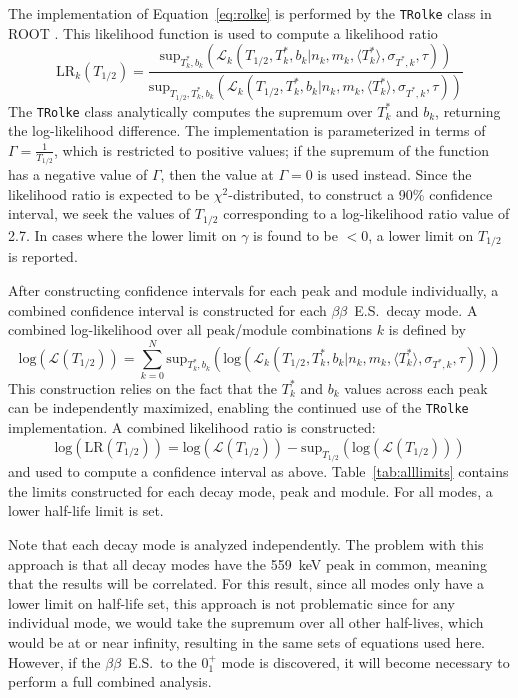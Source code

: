 \documentclass[notitlepage,rmp,aps,10pt]{revtex4-1}
\newcommand{\bb}{${\beta \beta}$}
\newcommand{\bbes}{\bb~E.S.}
\newcommand{\SP}[3]{$#1^{#2}_{#3}$}
\begin{document}
The implementation of Equation~\ref{eq:rolke} is performed by the \texttt{TRolke} class in ROOT \cite{rolke2005}.
This likelihood function is used to compute a likelihood ratio
\begin{equation}
  \mathrm{LR}_k(T_{1/2}) = \frac{\mathrm{sup}_{T^*_k,b_k}\left(\mathcal{L}_k(T_{1/2},T^*_k,b_k|n_k,m_k,\langle T^*_k\rangle, \sigma_{T^*,k},\tau)\right)}{\mathrm{sup}_{T_{1/2},T^*_k,b_k}\left(\mathcal{L}_k(T_{1/2},T^*_k,b_k|n_k,m_k,\langle T^*_k\rangle, \sigma_{T^*,k},\tau)\right)}
\end{equation}
The \texttt{TRolke} class analytically computes the supremum over $T^*_k$ and $b_k$, returning the log-likelihood difference.
The implementation is parameterized in terms of $\Gamma=\frac{1}{T_{1/2}}$, which is restricted to positive values; if the supremum of the function has a negative value of $\Gamma$, then the value at $\Gamma=0$ is used instead.
Since the likelihood ratio is expected to be $\chi^2$-distributed, to construct a 90\% confidence interval, we seek the values of $T_{1/2}$ corresponding to a log-likelihood ratio value of 2.7.
In cases where the lower limit on $\gamma$ is found to be $<0$, a lower limit on $T_{1/2}$ is reported.

After constructing confidence intervals for each peak and module individually, a combined confidence interval is constructed for each \bbes\ decay mode.
A combined log-likelihood over all peak/module combinations $k$ is defined by
\begin{equation}
  \mathrm{log}\left(\mathcal{L}(T_{1/2})\right) = \sum_{k=0}^{N} \mathrm{sup}_{T^*_k,b_k}\left(\mathrm{log}\left(\mathcal{L}_k(T_{1/2},T^*_k,b_k|n_k,m_k,\langle T^*_k\rangle, \sigma_{T^*,k},\tau)\right)\right)
\end{equation}
This construction relies on the fact that the $T^*_k$ and $b_k$ values across each peak can be independently maximized, enabling the continued use of the \texttt{TRolke} implementation.
A combined likelihood ratio is constructed:
\begin{equation}
  \mathrm{log}\left(\mathrm{LR}(T_{1/2})\right)=\mathrm{log}\left(\mathcal{L}(T_{1/2})\right) - \mathrm{sup}_{T_{1/2}}\left(\mathrm{log}\left(\mathcal{L}(T_{1/2})\right)\right)
\end{equation}
and used to compute a confidence interval as above.
Table~\ref{tab:alllimits} contains the limits constructed for each decay mode, peak and module.
For all modes, a lower half-life limit is set.

Note that each decay mode is analyzed independently.
The problem with this approach is that all decay modes have the 559~keV peak in common, meaning that the results will be correlated.
For this result, since all modes only have a lower limit on half-life set, this approach is not problematic since for any individual mode, we would take the supremum over all other half-lives, which would be at or near infinity, resulting in the same sets of equations used here.
However, if the \bbes\ to the \SP{0}{+}{1} mode is discovered, it will become necessary to perform a full combined analysis.
\end{document}
